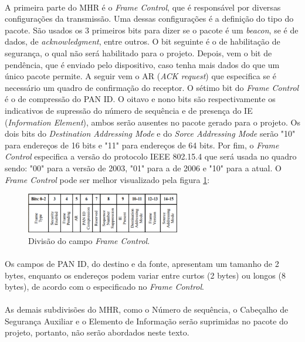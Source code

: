 \paragraph{}A primeira parte do MHR é o \textit{Frame Control}, que é responsável por diversas configurações da transmissão. Uma dessas configurações é a definição do tipo do pacote. São usados os 3 primeiros bits para dizer se o pacote é um \textit{beacon}, se é de dados, de \textit{acknowledgment}, entre outros. O bit seguinte é o de habilitação de segurança, o qual não será habilitado para o projeto. Depois, vem o bit de pendência, que é enviado pelo dispositivo, caso tenha mais dados do que um único pacote permite. A seguir vem o AR (\textit{ACK request}) que especifica se é necessário um quadro de confirmação do receptor. O sétimo bit do \textit{Frame Control} é o de compressão do PAN ID. O oitavo e nono bits são respectivamente os indicativos de supressão do número de sequência e de presença do IE (\textit{Information Element}), ambos serão ausentes no pacote gerado para o projeto. Os dois bits do \textit{Destination Addressing Mode} e do \textit{Sorce Addressing Mode} serão "10" para endereços de 16 bits e "11" para endereços de 64 bits. Por fim, o \textit{Frame Control} especifica a versão do protocolo IEEE 802.15.4 que será usada no quadro sendo: "00" para a versão de 2003, "01" para a de 2006 e "10" para a atual. O \textit{Frame Control} pode ser melhor visualizado pela figura \ref{fig:figura12}: 

\begin{figure}[!ht]
	\centering
	\includegraphics[width=0.6\textwidth]{Figuras/frame_control.PNG}   
	\caption{Divisão do campo \textit{Frame Control}. \citep{IEEE2015}}
	\label{fig:figura12}
\end{figure}

\paragraph{} Os campos de PAN ID, do destino e da fonte, apresentam um tamanho de 2 bytes, enquanto os endereços podem variar entre curtos (2 bytes) ou longos (8 bytes), de acordo com o especificado no \textit{Frame Control}.   

\paragraph{} As demais subdivisões do MHR, como o Número de sequência, o Cabeçalho de Segurança Auxiliar e o Elemento de Informação serão suprimidas no pacote do projeto, portanto, não serão abordados neste texto.

